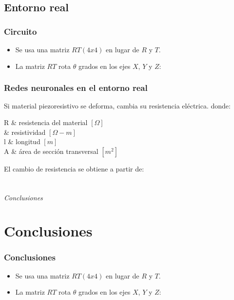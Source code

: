 \documentclass{beamer}
\makeatletter
\newenvironment{conditions*} %
	{\par\vspace{\abovedisplayskip}\noindent
	 \tabularx{\columnwidth}{>{$}l<{$} @{\ : } >{\raggedright\arraybackslash}X}}
	{\endtabularx\par\vspace{\belowdisplayskip}}
\makeatother
\begin{document}
\subsection{Entorno real}
\begin{frame}
	\frametitle{Circuito}
	\begin{itemize}
	\item Se usa una matriz $RT (4x4)$ en lugar de $R$ y $T$.
	\item La matriz $RT$ rota $\theta$ grados en los ejes $X$, $Y$ y $Z$:
	\end{itemize}
\end{frame}

\begin{frame}
	\frametitle{Redes neuronales en el entorno real}
	\begin{outline}
	\1 Si material piezoresistivo se deforma, cambia su resistencia eléctrica.
	donde:
	\begin{conditions*}
	R & resistencia del material $[\Omega]$\\
	\rho & resistividad $[\Omega-m]$\\
	l & longitud $[m]$\\
	A & área de sección transversal $[m^2]$
	\end{conditions*}
	\1 El cambio de resistencia se obtiene a partir de:
	\end{outline}
\end{frame}


\section*{}
\begin{frame}{}
	\centering \Huge
	\emph{Conclusiones}
\end{frame}

\section{Conclusiones}
	\begin{frame}
	\frametitle{Conclusiones}
	\begin{itemize}
	\item Se usa una matriz $RT (4x4)$ en lugar de $R$ y $T$.
	\item La matriz $RT$ rota $\theta$ grados en los ejes $X$, $Y$ y $Z$:
	\end{itemize}
\end{frame}
\end{document}
